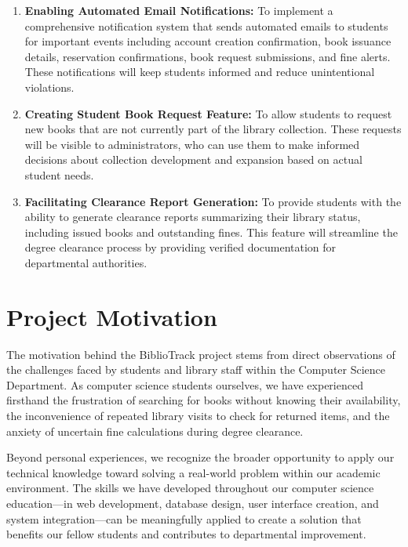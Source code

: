 \documentclass[12pt,a4paper]{report}
\begin{document}
\begin{enumerate}
    
    \item \textbf{Enabling Automated Email Notifications:} To implement a comprehensive notification system that sends automated emails to students for important events including account creation confirmation, book issuance details, reservation confirmations, book request submissions, and fine alerts. These notifications will keep students informed and reduce unintentional violations.

    
    \item \textbf{Creating Student Book Request Feature:} To allow students to request new books that are not currently part of the library collection. These requests will be visible to administrators, who can use them to make informed decisions about collection development and expansion based on actual student needs.
    
    \item \textbf{Facilitating Clearance Report Generation:} To provide students with the ability to generate clearance reports summarizing their library status, including issued books and outstanding fines. This feature will streamline the degree clearance process by providing verified documentation for departmental authorities.
\end{enumerate}


\section{Project Motivation}
\label{sec:motivation}

The motivation behind the BiblioTrack project stems from direct observations of the challenges faced by students and library staff within the Computer Science Department. As computer science students ourselves, we have experienced firsthand the frustration of searching for books without knowing their availability, the inconvenience of repeated library visits to check for returned items, and the anxiety of uncertain fine calculations during degree clearance.

Beyond personal experiences, we recognize the broader opportunity to apply our technical knowledge toward solving a real-world problem within our academic environment. The skills we have developed throughout our computer science education—in web development, database design, user interface creation, and system integration—can be meaningfully applied to create a solution that benefits our fellow students and contributes to departmental improvement.
\end{document}
